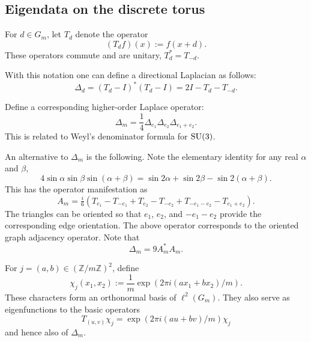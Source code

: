 \documentclass[11pt,reqno]{amsart}
\theoremstyle{remark}
\begin{document}
\subsection{Eigendata on the discrete torus}

For $d\in G_m$, let $T_d$ denote the operator
$$
 (T_df)(x):=f(x+d).
$$
These operators commute and are unitary, $T^*_d=T_{-d}$.

With this notation one can define a directional Laplacian as follows:
$$
\Delta_d =(T_d-I)^*(T_d -I)=2I-T_d-T_{-d}.
$$

Define a corresponding higher-order Laplace operator:
$$
\Delta_m = \frac 14 \Delta_{e_1}\Delta_{e_2}\Delta_{e_1+e_2}.
$$
This is related to Weyl's denominator formula for $\text{\rm SU}(3)$.


An alternative to $\Delta_m$ is the following. Note the elementary identity for any real $\alpha$ and $\beta$,
$$
4\sin\alpha\sin\beta\sin(\alpha+\beta) = \sin2\alpha+\sin2\beta-\sin2(\alpha+\beta).
$$
This has the operator manifestation as
$$
A_ m= \tfrac{i}{6}(T_{e_1}-T_{-e_1}+T_{e_2}-T_{-e_2}+T_{-e_1-e_2}-T_{e_1+e_2}).
$$
The triangles can be oriented so that $e_1$, $e_2$, and $-e_1 -e_2$ provide the corresponding edge orientation. The above operator corresponds to the oriented graph adjacency operator. Note that
$$
\Delta_m = 9A_m^*A_m.
$$


For $j=(a,b)\in (\mathbb Z/m\mathbb Z)^2$, define
$$
 \chi_{j}(x_1,x_2):=
 \frac1m\exp\left(2\pi i(ax_1+bx_2)/m\right).
$$
These characters form an orthonormal basis of
$\ell^2(G_m)$.  They also serve as eigenfunctions to the basic operators
$$
 T_{(u,v)}\chi_{j}
 =\exp \left(2\pi i(au+bv)/m\right)\chi_{j}
$$
and hence also of  $\Delta_m$.

\end{document}
